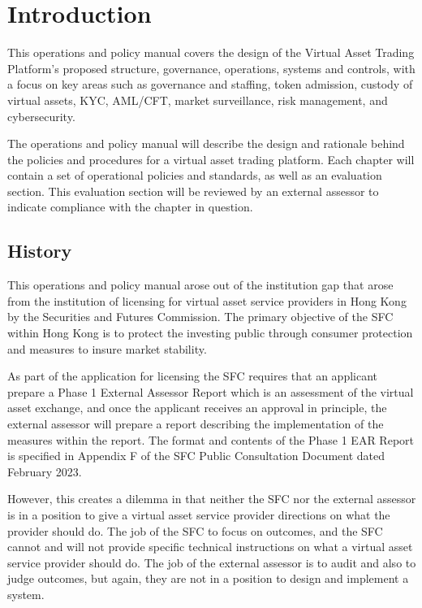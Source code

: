\chapter{Introduction}

This operations and policy manual covers the design of
the Virtual Asset Trading Platform's proposed structure, governance,
operations, systems and controls, with a focus on key areas such as
governance and staffing, token admission, custody of virtual assets,
KYC, AML/CFT, market surveillance, risk management, and cybersecurity.

The operations and policy manual will describe the design and
rationale behind the policies and procedures for a virtual asset
trading platform.  Each chapter will contain a set of operational
policies and standards, as well as an evaluation section.  This
evaluation section will be reviewed by an external assessor to
indicate compliance with the chapter in question.

\section{History}

This operations and policy manual arose out of the institution gap
that arose from the institution of licensing for virtual asset service
providers in Hong Kong by the Securities and Futures Commission.  The
primary objective of the SFC within Hong Kong is to protect the
investing public through consumer protection and measures to insure
market stability.

As part of the application for licensing the SFC requires that an
applicant prepare a Phase 1 External Assessor Report which is an
assessment of the virtual asset exchange, and once the applicant
receives an approval in principle, the external assessor will prepare
a report describing the implementation of the measures within the
report.  The format and contents of the Phase 1 EAR Report is
specified in Appendix F of the SFC Public Consultation Document dated
February 2023.

However, this creates a dilemma in that neither the SFC nor the
external assessor is in a position to give a virtual asset service
provider directions on what the provider should do.  The job of the
SFC to focus on outcomes, and the SFC cannot and will not provide
specific technical instructions on what a virtual asset service
provider should do.  The job of the external assessor is to audit and
also to judge outcomes, but again, they are not in a position to
design and implement a system.

